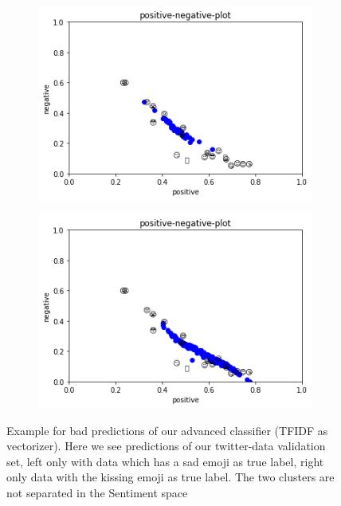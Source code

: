 \documentclass{article}
\begin{document}
\begin{figure}[h]
\centering
\begin{subfigure}{0.49\textwidth}
\centering
\includegraphics[width=0.9\linewidth]{images/pn-plot-sad.png}
\end{subfigure}
\begin{subfigure}{0.49\textwidth}
\centering
\includegraphics[width=0.9\linewidth]{images/pn-plot_kiss.png}
\end{subfigure}
\caption{Example for bad predictions of our advanced classifier (TFIDF as vectorizer). Here we see predictions of our twitter-data validation set, left only with data which has a sad emoji as true label, right only data with the kissing emoji as true label. The two clusters are not separated in the Sentiment space}
\label{fig:bad_cluster}
\end{figure}
\end{document}
